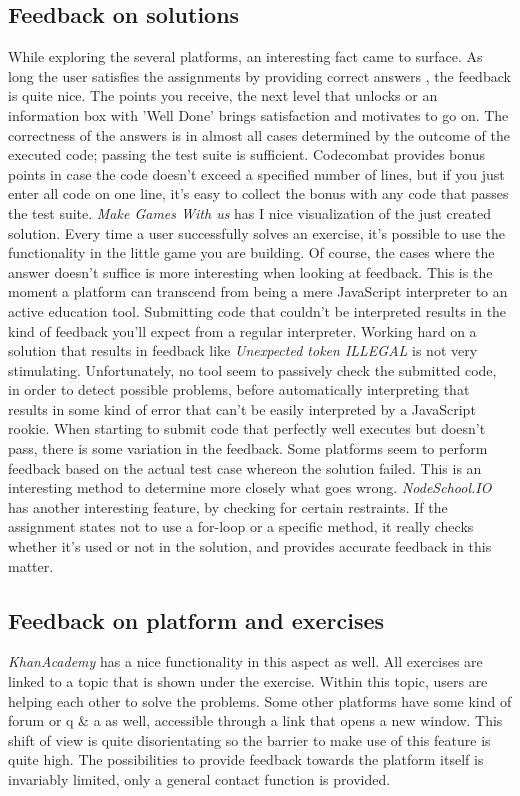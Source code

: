 \documentclass{article}
\begin{document}
\subsection{Feedback on solutions}
While exploring the several platforms, an interesting fact came to
surface. As long the user satisfies the assignments by providing correct answers
, the feedback is quite nice. The points you receive, the next level that
unlocks or an information box with 'Well Done' brings satisfaction and motivates
to go on. The correctness of the answers is in almost all cases determined by
the outcome of the executed code; passing the test suite is sufficient.
Codecombat provides bonus points in case the code doesn't exceed a specified 
number of lines, but if you just enter all code on one line, it's easy to 
collect the bonus with any code that passes the test suite. 
{\em Make Games With us} has I nice
visualization of the just created solution. Every time a user successfully solves
an exercise, it's possible to use the functionality in the little game you are
building. \newline
Of course, the cases where the answer doesn't suffice is more interesting when
looking at feedback. This is the moment a platform can transcend from being a
mere JavaScript interpreter to an active education tool. Submitting code that 
couldn't be interpreted results in the kind of feedback you'll expect from a 
regular interpreter. Working hard on a solution that results in feedback like 
{\em Unexpected token ILLEGAL} is not very stimulating. Unfortunately, no tool 
seem to passively check the submitted code, in order to detect possible
problems, before automatically interpreting that results in some kind of error
that can't be easily interpreted by a JavaScript rookie. 
\newline When starting to submit code that perfectly well executes but doesn't
pass, there is
some variation in the feedback. Some platforms seem to perform feedback based 
on the actual test case whereon the solution failed. This is an interesting 
method to determine more closely what goes wrong. {\em NodeSchool.IO} has another 
interesting feature, by checking for certain restraints. If the assignment 
states not to use a for-loop or a specific method, it really checks whether 
it's used or not in the solution, and provides accurate feedback in this matter.

\subsection{Feedback on platform and exercises}
{\em KhanAcademy} has a nice functionality in this aspect as well. All exercises are 
linked to a topic that is shown under the exercise. Within this topic, users are 
helping each other to solve the problems. Some other platforms have some kind
of forum or q \& a as well, accessible through a link that opens a new window. 
This shift of view is quite disorientating so the barrier to make use 
of this feature is quite high. The possibilities to provide feedback towards the 
platform itself is invariably limited, only a general contact function is 
provided. 
\end{document}
